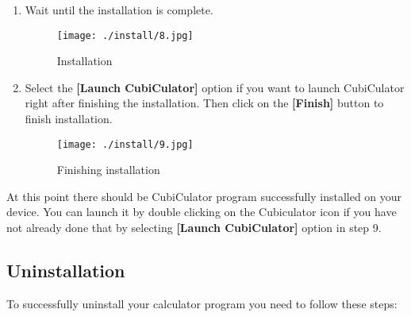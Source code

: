 \documentclass{article}
\begin{document}
\begin{enumerate}
\newpage
\item Wait until the installation is complete.
\begin{figure}[H]
    \centering
    \texttt{[image: ./install/8.jpg]}
    \caption{Installation}
  \end{figure}

\item Select the \textbf{[Launch CubiCulator]} option if you want to launch CubiCulator right after finishing the installation. Then click on the \textbf{[Finish]} button to finish installation.
\begin{figure}[H]
    \centering
    \texttt{[image: ./install/9.jpg]}
    \caption{Finishing installation}
  \end{figure}



\end{enumerate}
At this point there should be CubiCulator program successfully installed on your device. You can launch it by double clicking on the Cubiculator icon if you have not already done that by selecting \textbf{[Launch CubiCulator]} option in step 9.

\newpage
\subsection{Uninstallation}
To successfully uninstall your calculator program you need to follow these steps:
\end{document}
